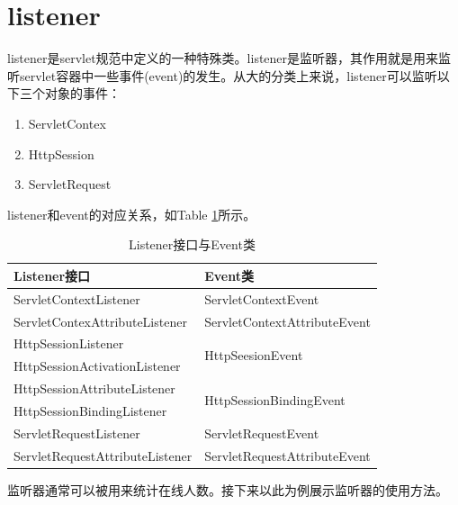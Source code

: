 \section{listener}
listener是servlet规范中定义的一种特殊类。listener是监听器，其作用就是用来监听servlet容器中一些事件(event)的发生。从大的分类上来说，listener可以监听以下三个对象的事件：\begin{enumerate}
\item
ServletContex
\item
HttpSession
\item
ServletRequest
\end{enumerate}
listener和event的对应关系，如Table \ref{le}所示。
\begin{table}
\begin{tabular}{ll}
\toprule
\textbf{Listener接口}&\textbf{Event类}\\
\midrule
ServletContextListener&ServletContextEvent\\
ServletContexAttributeListener&ServletContextAttributeEvent\\
HttpSessionListener&\multirow{2}{*}{HttpSeesionEvent}\\
HttpSessionActivationListener&\\
HttpSessionAttributeListener&\multirow{2}{*}{HttpSessionBindingEvent}\\
HttpSessionBindingListener&\\
ServletRequestListener&ServletRequestEvent\\
ServletRequestAttributeListener&ServletRequestAttributeEvent\\
\bottomrule
\end{tabular}
\caption{Listener接口与Event类}
\label{le}
\end{table}

监听器通常可以被用来统计在线人数。接下来以此为例展示监听器的使用方法。
